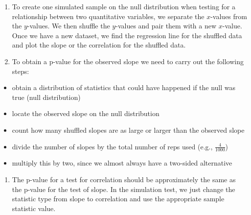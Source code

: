 \documentclass[
  letterpaper,
  DIV=11,
  numbers=noendperiod]{scrartcl}
\providecommand{\tightlist}{%
  \setlength{\itemsep}{0pt}\setlength{\parskip}{0pt}}\usepackage{longtable,booktabs,array}
\begin{document}
\begin{enumerate}
\def\labelenumi{\arabic{enumi}.}
\item
  To create one simulated sample on the null distribution when testing
  for a relationship between two quantitative variables, we separate the
  \(x\)-values from the \(y\)-values. We then shuffle the \(y\)-values
  and pair them with a new \(x\)-value. Once we have a new dataset, we
  find the regression line for the shuffled data and plot the slope or
  the correlation for the shuffled data.
\item
  To obtain a p-value for the observed slope we need to carry out the
  following steps:
\end{enumerate}

\begin{itemize}
\item
  obtain a distribution of statistics that could have happened if the
  null was true (null distribution)
\item
  locate the observed slope on the null distribution
\item
  count how many shuffled slopes are as large or larger than the
  observed slope
\item
  divide the number of slopes by the total number of reps used (e.g.,
  \(\frac{4}{1000}\))
\item
  multiply this by two, since we almost always have a two-sided
  alternative
\end{itemize}

\begin{enumerate}
\def\labelenumi{\arabic{enumi}.}
\setcounter{enumi}{2}
\tightlist
\item
  The p-value for a test for correlation should be approximately the
  same as the p-value for the test of slope. In the simulation test, we
  just change the statistic type from slope to correlation and use the
  appropriate sample statistic value.
\end{enumerate}
\end{document}
